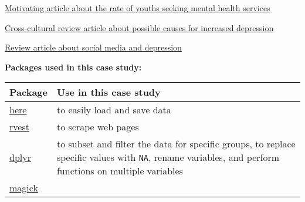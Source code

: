 \documentclass[
]{article}
\begin{document}
\href{https://pubmed.ncbi.nlm.nih.gov/24285382/}{Motivating article
about the rate of youths seeking mental health services}

\href{https://www.ncbi.nlm.nih.gov/pmc/articles/PMC3330161/}{Cross-cultural
review article about possible causes for increased depression}

\href{https://childmind.org/article/is-social-media-use-causing-depression/}{Review
article about social media and depression}

\textbf{Packages used in this case study:}

\begin{longtable}[]{@{}ll@{}}
\toprule
\begin{minipage}[b]{0.41\columnwidth}\raggedright
Package\strut
\end{minipage} & \begin{minipage}[b]{0.53\columnwidth}\raggedright
Use in this case study\strut
\end{minipage}\tabularnewline
\midrule
\endhead
\begin{minipage}[t]{0.41\columnwidth}\raggedright
\href{https://github.com/jennybc/here_here}{here}\strut
\end{minipage} & \begin{minipage}[t]{0.53\columnwidth}\raggedright
to easily load and save data\strut
\end{minipage}\tabularnewline
\begin{minipage}[t]{0.41\columnwidth}\raggedright
\href{https://github.com/tidyverse/rvest}{rvest}\strut
\end{minipage} & \begin{minipage}[t]{0.53\columnwidth}\raggedright
to scrape web pages\strut
\end{minipage}\tabularnewline
\begin{minipage}[t]{0.41\columnwidth}\raggedright
\href{https://dplyr.tidyverse.org/}{dplyr}\strut
\end{minipage} & \begin{minipage}[t]{0.53\columnwidth}\raggedright
to subset and filter the data for specific groups, to replace specific
values with \texttt{NA}, rename variables, and perform functions on
multiple variables\strut
\end{minipage}\tabularnewline
\begin{minipage}[t]{0.41\columnwidth}\raggedright
\href{https://cran.r-project.org/web/packages/magick/vignettes/intro.html\#Kernel_convolution}{magick}\strut
\end{minipage} & \begin{minipage}[t]{0.53\columnwidth}\raggedright

\end{minipage}
\end{longtable}
\end{document}
